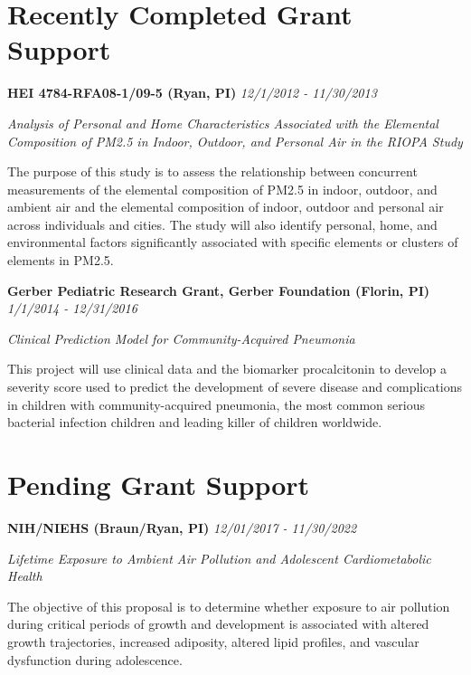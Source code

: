 \documentclass[margin,line]{res}
\newenvironment{list3}{
  \begin{list}{}{%
      \setlength{\itemsep}{0in}
      \setlength{\parsep}{0in} \setlength{\parskip}{0in}
      \setlength{\topsep}{0in} \setlength{\partopsep}{0in} 
      \setlength{\leftmargin}{0in}}}{\end{list}}
\begin{document}
\begin{resume}
\vspace*{.1in}

\section{\sc Recently Completed Grant Support}

\begin{list3} \itemsep 4pt
    \item[] \textbf{HEI 4784-RFA08-1/09-5 (Ryan, PI)} \hfill \textit{12/1/2012 - 11/30/2013}
    \item[] \textit{Analysis of Personal and Home Characteristics Associated with the Elemental Composition of PM2.5 in Indoor, Outdoor, and Personal Air in the RIOPA Study}
    \item[] The purpose of this study is to assess the relationship between concurrent measurements of the elemental composition of PM2.5 in indoor, outdoor, and ambient air and the elemental composition of indoor, outdoor and personal air across individuals and cities. The study will also identify personal, home, and environmental factors significantly associated with specific elements or clusters of elements in PM2.5.
\end{list3}

\vspace*{.1in}

\begin{list3} \itemsep 4pt
    \item[] \textbf{Gerber Pediatric Research Grant, Gerber Foundation (Florin, PI)} \hfill \textit{1/1/2014 - 12/31/2016}
\item[] \textit{Clinical Prediction Model for Community-Acquired Pneumonia}
\item[] This project will use clinical data and the biomarker procalcitonin to develop a severity score used to predict the development of severe disease and complications in children with community-acquired pneumonia, the most common serious bacterial infection children and leading killer of children worldwide.
\end{list3}

\vspace*{.1in}


\section{\sc Pending Grant Support}


\begin{list3} \itemsep 4pt
    \item[] \textbf{NIH/NIEHS (Braun/Ryan, PI)} \hfill \textit{12/01/2017 - 11/30/2022}
\item[] \textit{Lifetime Exposure to Ambient Air Pollution and Adolescent Cardiometabolic Health}
\item[] The objective of this proposal is to determine whether exposure to air pollution during critical periods of growth and development is associated with altered growth trajectories, increased adiposity, altered lipid profiles, and vascular dysfunction during adolescence.
\end{list3}


\end{resume}
\end{document}
